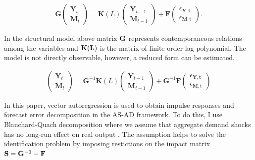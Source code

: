 \documentclass[a4paper,12pt]{article}
\begin{document}
\begin{equation} \label{eq:2}
\begin{split}
		\mathbf{G}\left(\begin{array}{c}
		\mathbf{Y}_{t} \\
		\mathbf{M}_{t}
		\end{array}\right)=\mathbf{K}(L)\left(\begin{array}{c}
		\mathbf{Y}_{t-1} \\
		\mathbf{M}_{t-1}
		\end{array}\right)+\mathbf{F}\left(\begin{array}{c}
		\epsilon_{\mathbf{Y}, \mathbf{t}} \\
		\epsilon_{\mathbf{M}, \mathrm{t}}
		\end{array}\right).
\end{split}
\end{equation}

In the structural model above matrix \(\bf G\) represents contemporaneous relations among the variables and \(\bf K(L)\) is the matrix of finite-order lag polynomial. The model is not directly observable, however, a reduced form can be estimated.

\begin{equation} \label{eq:3}
\begin{split}
		\left(\begin{array}{c}
		\mathbf{Y}_{t} \\
		\mathbf{M}_{t}
		\end{array}\right)=\mathbf{G}^{-1} \mathbf{K}(L)\left(\begin{array}{c}
		\mathbf{Y}_{t-1} \\
		\mathbf{M}_{t-1}
		\end{array}\right)+\mathbf{G}^{-1} \mathbf{F}\left(\begin{array}{c}
		\epsilon_{\mathbf{Y}, \mathbf{t}} \\
		\epsilon_{\mathbf{M}, \mathrm{t}}
		\end{array}\right)
\end{split}
\end{equation}

In this paper, vector autoregression is used to obtain impulse responses and forecast error decomposition in the AS-AD framework. To do this, I use Blanchard-Quach decomposition where we assume that aggregate demand shocks has no long-run effect on real output \citep{blanchardquah89}. The assumption helps to solve the identification problem by imposing restictions on the impact matrix \(\bf S = G^{-1}-F\)
\end{document}
